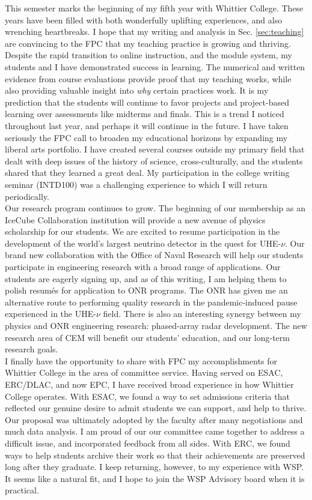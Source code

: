 \documentclass[../main.tex]{subfiles}
\begin{document}
This semester marks the beginning of my fifth year with Whittier College.  These years have been filled with both wonderfully uplifting experiences, and also wrenching heartbreaks.  I hope that my writing and analysis in Sec. \ref{sec:teaching} are convincing to the FPC that my teaching practice is growing and thriving.  Despite the rapid transition to online instruction, and the module system, my students and I have demonstrated success in learning.  The numerical and written evidence from course evaluations provide proof that my teaching works, while also providing valuable insight into \textit{why} certain practices work.  It is my prediction that the students will continue to favor projects and project-based learning over assessments like midterms and finals.  This is a trend I noticed throughout last year, and perhaps it will continue in the future.  I have taken seriously the FPC call to broaden my educational horizons by expanding my liberal arts portfolio.  I have created several courses outside my primary field that dealt with deep issues of the history of science, cross-culturally, and the students shared that they learned a great deal.  My participation in the college writing seminar (INTD100) was a challenging experience to which I will return periodically.
\\
\vspace{0.15cm}
Our research program continues to grow.  The beginning of our membership as an IceCube Collaboration institution will provide a new avenue of physics scholarship for our students.  We are excited to resume participation in the development of the world's largest neutrino detector in the quest for UHE-$\nu$.  Our brand new collaboration with the Office of Naval Research will help our students participate in engineering research with a broad range of applications.  Our students are eagerly signing up, and as of this writing, I am helping them to polish resum\'{e}s for application to ONR programs.  The ONR has given me an alternative route to performing quality research in the pandemic-induced pause experienced in the UHE-$\nu$ field.  There is also an interesting synergy between my physics and ONR engineering research: phased-array radar development.  The new research area of CEM will benefit our students' education, and our long-term research goals.
\\
\vspace{0.15cm}
I finally have the opportunity to share with FPC my accomplishments for Whittier College in the area of committee service.  Having served on ESAC, ERC/DLAC, and now EPC, I have received broad experience in how Whittier College operates.  With ESAC, we found a way to set admissions criteria that reflected our genuine desire to admit students we can support, and help to thrive.  Our proposal was ultimately adopted by the faculty after many negotiations and much data analysis.  I am proud of our our committee came together to address a difficult issue, and incorporated feedback from all sides.  With ERC, we found ways to help students archive their work so that their achievements are preserved long after they graduate.  I keep returning, however, to my experience with WSP.  It seems like a natural fit, and I hope to join the WSP Advisory board when it is practical.
\end{document}

